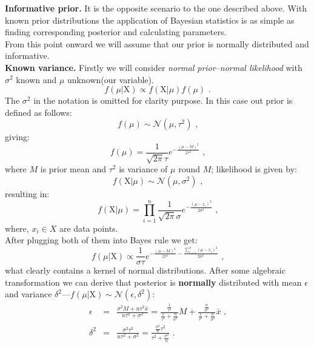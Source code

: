 \documentclass[12pt, a4paper, pdflatex, leqno]{report}
\begin{document}

\textbf{\textrm{Informative prior. }}It is the opposite scenario to the one described above. With known prior distributions the application of Bayesian statistics is as simple as finding corresponding posterior and calculating parameters.\\
From this point onward we will assume that our prior is normally distributed and informative.\\[2cm]




\textbf{\textrm{Known variance. }}Firstly we will consider \emph{normal prior--normal likelihood} with $\sigma^2$ known and $\mu$ unknown(our variable).
$$
f \left( \mu | \mathrm{X} \right) \propto f \left( \mathrm{X} | \mu \right) f \left( \mu \right) \text{ .}
$$
The $\sigma^2$ in the notation is omitted for clarity purpose. In this case out prior is defined as follows:
$$
f \left( \mu \right)    \sim   \mathcal{N}\left( \mu, \tau^2 \right) \text{ ,}
$$
giving:
$$
f \left( \mu \right)    =     \frac{1}{\sqrt{2\pi} \tau} e^{- \frac{{\left( \mu - M \right)}^2}{2 \tau^2} } \text{ ,}
$$
where $M$ is prior mean and $\tau^2$ is variance of $\mu$ round $M$; likelihood is given by:
$$
f \left( \mathrm{X} | \mu \right)     \sim    \mathcal{N}\left( \mu, \sigma^2 \right) \text{ ,}
$$
resulting in:
$$
f \left( \mathrm{X} | \mu \right)    =     \prod_{i=1}^{n} \frac{1}{\sqrt{2\pi} \sigma} e^{- \frac{{\left( \mu - x_i \right)}^2}{2 \sigma^2} } \text{ ,}
$$
where, $x_i \in X$ are data points.\\
After plugging both of them into Bayes rule we get:
$$
f \left( \mu | \mathrm{X} \right)     \propto     \frac{1}{\sigma \tau} e^{ -\frac{ {\left( \mu - M \right)}^2 }{2 \tau^2} -\frac{ \sum_{i=1}^{n} {\left( \mu - x_i \right)}^2 }{2 \sigma^2} } \text{ ,}
$$
what clearly contains a kernel of normal distributions. After some algebraic transformation we can derive that posterior is \textbf{normally} distributed with mean $\epsilon$ and variance $\delta^2$---$f \left( \mu | \mathrm{X} \right) \sim \mathcal{N} \left( \epsilon, \delta^2 \right) $:
\begin{eqnarray*}
\epsilon &=& \frac{\sigma^2 M + n \tau^2 \bar{x}}{n \tau^2 + \sigma^2} = \frac{ \frac{1}{\tau^2} }{ \frac{1}{\tau^2} + \frac{n}{\sigma^2} }M + \frac{ \frac{n}{\sigma^2} }{ \frac{1}{\tau^2} + \frac{n}{\sigma^2} } \bar{x} \text{ ,} \\
\delta^2 &=& \frac{\sigma^2 \tau^2}{n \tau^2 + \sigma^2} = \frac{ \frac{\sigma^2}{n} \tau^2 }{ \tau^2 + \frac{\sigma^2}{n} } \text{ .}
\end{eqnarray*}
\\
\end{document}
